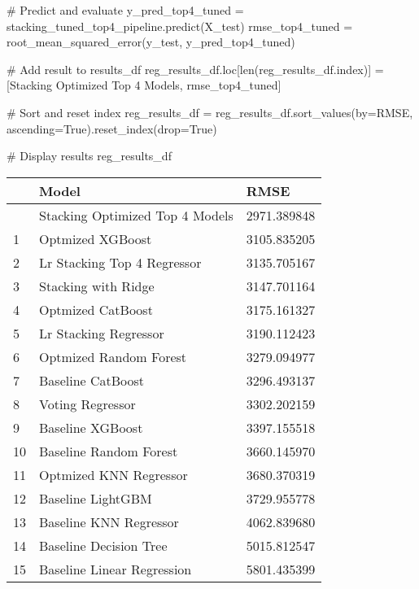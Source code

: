 \documentclass[
  letterpaper,
  DIV=11,
  numbers=noendperiod]{scrreprt}
\newenvironment{Shaded}{\begin{snugshade}}{\end{snugshade}}
\newcommand{\BuiltInTok}[1]{\textcolor[rgb]{0.00,0.23,0.31}{#1}}
\newcommand{\CommentTok}[1]{\textcolor[rgb]{0.37,0.37,0.37}{#1}}
\newcommand{\NormalTok}[1]{\textcolor[rgb]{0.00,0.23,0.31}{#1}}
\newcommand{\OperatorTok}[1]{\textcolor[rgb]{0.37,0.37,0.37}{#1}}
\newcommand{\StringTok}[1]{\textcolor[rgb]{0.13,0.47,0.30}{#1}}
\newcommand{\VariableTok}[1]{\textcolor[rgb]{0.07,0.07,0.07}{#1}}
\begin{document}
\begin{Shaded}
\begin{Highlighting}[]
\CommentTok{\# Predict and evaluate}
\NormalTok{y\_pred\_top4\_tuned }\OperatorTok{=}\NormalTok{ stacking\_tuned\_top4\_pipeline.predict(X\_test)}
\NormalTok{rmse\_top4\_tuned }\OperatorTok{=}\NormalTok{ root\_mean\_squared\_error(y\_test, y\_pred\_top4\_tuned)}

\CommentTok{\# Add result to results\_df}
\NormalTok{reg\_results\_df.loc[}\BuiltInTok{len}\NormalTok{(reg\_results\_df.index)] }\OperatorTok{=}\NormalTok{ [}\StringTok{\textquotesingle{}Stacking Optimized Top 4 Models\textquotesingle{}}\NormalTok{, rmse\_top4\_tuned]}

\CommentTok{\# Sort and reset index}
\NormalTok{reg\_results\_df }\OperatorTok{=}\NormalTok{ reg\_results\_df.sort\_values(by}\OperatorTok{=}\StringTok{\textquotesingle{}RMSE\textquotesingle{}}\NormalTok{, ascending}\OperatorTok{=}\VariableTok{True}\NormalTok{).reset\_index(drop}\OperatorTok{=}\VariableTok{True}\NormalTok{)}

\CommentTok{\# Display results}
\NormalTok{reg\_results\_df}
\end{Highlighting}
\end{Shaded}

\begin{longtable}[]{@{}lll@{}}
\toprule\noalign{}
& Model & RMSE \\
\midrule\noalign{}
\endhead
\bottomrule\noalign{}
\endlastfoot
0 & Stacking Optimized Top 4 Models & 2971.389848 \\
1 & Optmized XGBoost & 3105.835205 \\
2 & Lr Stacking Top 4 Regressor & 3135.705167 \\
3 & Stacking with Ridge & 3147.701164 \\
4 & Optmized CatBoost & 3175.161327 \\
5 & Lr Stacking Regressor & 3190.112423 \\
6 & Optmized Random Forest & 3279.094977 \\
7 & Baseline CatBoost & 3296.493137 \\
8 & Voting Regressor & 3302.202159 \\
9 & Baseline XGBoost & 3397.155518 \\
10 & Baseline Random Forest & 3660.145970 \\
11 & Optmized KNN Regressor & 3680.370319 \\
12 & Baseline LightGBM & 3729.955778 \\
13 & Baseline KNN Regressor & 4062.839680 \\
14 & Baseline Decision Tree & 5015.812547 \\
15 & Baseline Linear Regression & 5801.435399 \\
\end{longtable}
\end{document}
